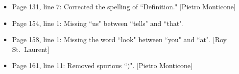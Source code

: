 \documentclass[11pt]{article}%
\begin{document}
\begin{itemize}
\item Page 131, line 7: Corrected the spelling of ``Definition." [Pietro Monticone]
\item Page 154, line 1: Missing ``us" between ``tells" and ``that".
\item Page 158, line 1: Missing the word ``look" between ``you" and ``at". [Roy St.~Laurent]
\item Page 161, line 11: Removed spurious ``$)$". [Pietro Monticone]
\end{itemize}
\end{document}
